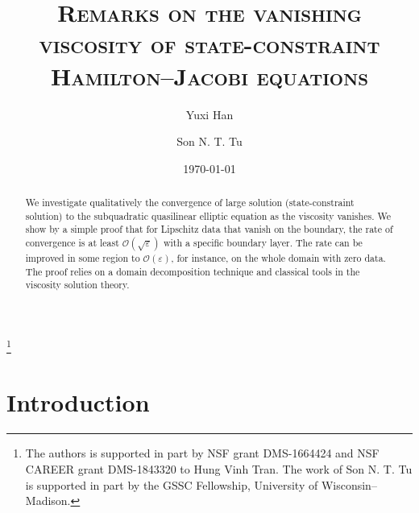 \documentclass[11pt,reqno]{amsart}
\numberwithin{figure}{section}
\theoremstyle{plain}
\theoremstyle{remark}
\numberwithin{equation}{section}
\begin{document}
\title[Rate of convergence]
{\textsc{Remarks on the vanishing viscosity of state-constraint Hamilton--Jacobi equations}}
\thanks{The authors is supported in part by NSF grant DMS-1664424 and NSF CAREER grant DMS-1843320
to Hung Vinh Tran. The work of Son N. T. Tu is supported in part by the GSSC Fellowship, University of Wisconsin--Madison.}
\begin{abstract}
We investigate qualitatively the convergence of large solution (state-constraint solution) to the subquadratic quasilinear elliptic equation as the viscosity vanishes. We show by a simple proof that for Lipschitz data that vanish on the boundary, the rate of convergence is at least $\mathcal{O}(\sqrt{\varepsilon})$ with a specific boundary layer. The rate can be improved in some region to $\mathcal{O}(\varepsilon)$, for instance, on the whole domain with zero data. The proof relies on a domain decomposition technique and classical tools in the viscosity solution theory.
\end{abstract}
\author{Yuxi Han}
\address[Y. Han]
{
Department of Mathematics, 
University of Wisconsin Madison, 480 Lincoln  Drive, Madison, WI 53706, USA}
\author{Son N. T. Tu}
\address[S. N.T. Tu]
{
Department of Mathematics, 
University of Wisconsin Madison, 480 Lincoln  Drive, Madison, WI 53706, USA}
\date{\today}
\maketitle
\setcounter{tocdepth}{1}
\tableofcontents

\section{Introduction}\label{sec:intro}
\end{document}
